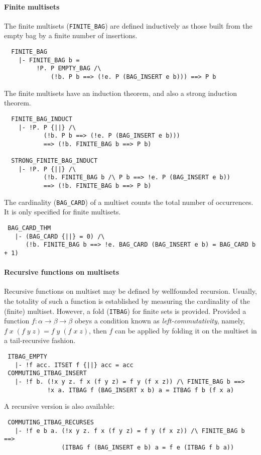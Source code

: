 \paragraph {Finite multisets}

The finite multisets ({\small\verb+FINITE_BAG+}) are defined inductively as those
built from the empty bag by a finite number of insertions.
%
{\small
\begin{verbatim}
  FINITE_BAG
    |- FINITE_BAG b =
         !P. P EMPTY_BAG /\
             (!b. P b ==> (!e. P (BAG_INSERT e b))) ==> P b
\end{verbatim}}
%
\noindent The finite multisets have an induction theorem, and also a strong
induction theorem.
%
{\small
\begin{verbatim}
  FINITE_BAG_INDUCT
    |- !P. P {||} /\
           (!b. P b ==> (!e. P (BAG_INSERT e b)))
           ==> (!b. FINITE_BAG b ==> P b)

  STRONG_FINITE_BAG_INDUCT
    |- !P. P {||} /\
           (!b. FINITE_BAG b /\ P b ==> !e. P (BAG_INSERT e b))
           ==> (!b. FINITE_BAG b ==> P b)
\end{verbatim}}
%
The cardinality ({\small\verb+BAG_CARD+}) of a multiset counts the
total number of occurrences. It is only specified for finite multisets.
%
{\small
\begin{verbatim}
 BAG_CARD_THM
   |- (BAG_CARD {||} = 0) /\
      (!b. FINITE_BAG b ==> !e. BAG_CARD (BAG_INSERT e b) = BAG_CARD b + 1)
\end{verbatim}}

\paragraph{Recursive functions on multisets}

Recursive functions on multiset may be defined by wellfounded
recursion. Usually, the totality of such a function is established by
measuring the cardinality of the (finite) multiset. However,
a fold ({\small\verb+ITBAG+}) for finite sets is provided.
Provided a function $f:\alpha\to\beta\to\beta$ obeys a condition
known as \emph{left-commutativity}, namely, $f\;x\;(f\;y\;z) =
f\;y\;(f\;x\;z)$, then $f$ can be applied by folding it on the multiset
in a tail-recursive fashion.
%
{\small
\begin{verbatim}
 ITBAG_EMPTY
   |- !f acc. ITSET f {||} acc = acc
 COMMUTING_ITBAG_INSERT
   |- !f b. (!x y z. f x (f y z) = f y (f x z)) /\ FINITE_BAG b ==>
            !x a. ITBAG f (BAG_INSERT x b) a = ITBAG f b (f x a)
\end{verbatim}}
%
\noindent A recursive version is also available:
{\small
\begin{verbatim}
 COMMUTING_ITBAG_RECURSES
   |- !f e b a. (!x y z. f x (f y z) = f y (f x z)) /\ FINITE_BAG b ==>
                (ITBAG f (BAG_INSERT e b) a = f e (ITBAG f b a))
\end{verbatim}}

